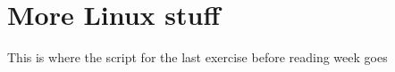 \chapter{More Linux stuff}

\begin{note}
  This is where the script for the last exercise before reading week goes

\end{note}


